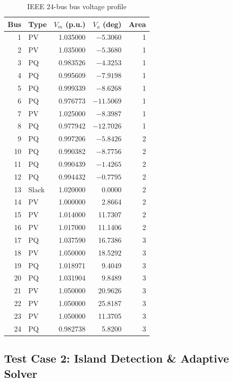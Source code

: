 \documentclass[11pt]{article}
\begin{document}
\begin{table}[h]
\centering
\caption{IEEE 24-bus bus voltage profile}
\label{tab:ieee24_voltage}
\small
\begin{tabular}{r l r r r}
\toprule
Bus & Type & $V_m$ (p.u.) & $V_a$ (deg) & Area \\
\midrule
 1 & PV    & 1.035000 &  $-5.3060$ & 1 \\
 2 & PV    & 1.035000 &  $-5.3680$ & 1 \\
 3 & PQ    & 0.983526 &  $-4.3253$ & 1 \\
 4 & PQ    & 0.995609 &  $-7.9198$ & 1 \\
 5 & PQ    & 0.999339 &  $-8.6268$ & 1 \\
 6 & PQ    & 0.976773 & $-11.5069$ & 1 \\
 7 & PV    & 1.025000 &  $-8.3987$ & 1 \\
 8 & PQ    & 0.977942 & $-12.7026$ & 1 \\
 9 & PQ    & 0.997206 &  $-5.8426$ & 2 \\
10 & PQ    & 0.990382 &  $-8.7756$ & 2 \\
11 & PQ    & 0.990439 &  $-1.4265$ & 2 \\
12 & PQ    & 0.994432 &  $-0.7795$ & 2 \\
13 & Slack & 1.020000 &   0.0000 & 2 \\
14 & PV    & 1.000000 &   2.8664 & 2 \\
15 & PV    & 1.014000 &  11.7307 & 2 \\
16 & PV    & 1.017000 &  11.1406 & 2 \\
17 & PQ    & 1.037590 &  16.7386 & 3 \\
18 & PV    & 1.050000 &  18.5292 & 3 \\
19 & PQ    & 1.018971 &   9.4049 & 3 \\
20 & PQ    & 1.031904 &   9.8489 & 3 \\
21 & PV    & 1.050000 &  20.9626 & 3 \\
22 & PV    & 1.050000 &  25.8187 & 3 \\
23 & PV    & 1.050000 &  11.3705 & 3 \\
24 & PQ    & 0.982738 &   5.8200 & 3 \\
\bottomrule
\end{tabular}
\end{table}

\subsection{Test Case 2: Island Detection \& Adaptive Solver}
\end{document}
